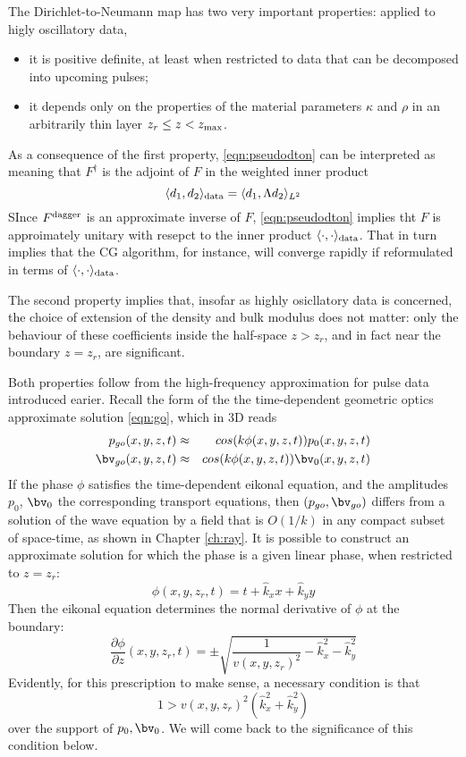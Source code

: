 The Dirichlet-to-Neumann map has two very important properties: applied to higly oscillatory data,
\begin{itemize}
\item it is positive definite, at least when restricted to data that can be decomposed into upcoming pulses;
\item it depends only on the properties of the material parameters $\kappa$ and $\rho$ in an arbitrarily thin layer $z_r\le z <z_{\rm max}$.
\end{itemize}

As a consequence of the first property, \ref{eqn:pseudodton} can be interpreted as meaning that $F^{\dagger}$ is the adjoint of $F$ in the weighted inner product
\[
\langle d_1, d_2 \rangle_{\rm data} = \langle d_1,\Lambda d_2 \rangle_{L^2}
\]
SInce $F^{\rm dagger}$ is an approximate inverse of $F$, \ref{eqn:pseudodton} implies tht $F$ is approimately unitary with resepct to the inner product $\langle \cdot,\cdot \rangle_{\rm data}$. That in turn implies that the CG algorithm, for instance, will converge rapidly if reformulated in terms of $\langle \cdot,\cdot \rangle_{\rm data}$.

The second property implies that, insofar as highly osicllatory data is concerned, the 
choice of extension of the density and bulk modulus does not matter: only the behaviour of these coefficients inside the half-space $z>z_r$, and in fact near the boundary $z=z_r$, are significant.

Both properties follow from the high-frequency approximation for pulse data introduced earier. Recall the  form of the the time-dependent geometric optics approximate solution \ref{eqn:go}, which in 3D reads
\begin{eqnarray}
\label{eqn:go1}
p_{go}(x,y,z,t) & \approx & cos(k \phi(x,y,z,t))p_0(x,y,z,t)\nonumber \\
\bv_{go}(x,y,z,t) & \approx & cos(k \phi(x,y,z,t))\bv_0(x,y,z,t) 
\end{eqnarray}
If the phase $\phi$ satisfies the time-dependent eikonal equation, and the amplitudes $p_0$, $\bv_0$ the corresponding transport equations, then $(p_{go},\bv_{go})$ differs from a solution of the wave equation by a field that is $O(1/k)$ in any compact subset of space-time, as shown in Chapter \ref{ch:ray}. 
It is possible to construct an approximate solution for which the phase is a given linear phase, when restricted to $z=z_r$:
\[
\phi(x,y,z_r,t) = t + \hat{k}_x x + \hat{k}_y y
\]
Then the eikonal equation determines the normal derivative of $\phi$ at the boundary:
\begin{equation}
\label{eqn:dphidz}
\frac{\partial \phi}{\partial z}(x,y,z_r,t) = \pm \sqrt{\frac{1}{v(x,y,z_r)^2}-\hat{k}_x^2-\hat{k}_y^2}
\end{equation}
Evidently, for this prescription to make sense, a necessary condition is that
\begin{equation}
\label{eqn:timelike}
1 > v(x,y,z_r)^2(\hat{k}_x^2+\hat{k}_y^2)
\end{equation}
over the support of $p_0,\bv_0$. We will come back to the significance of this condition below.

